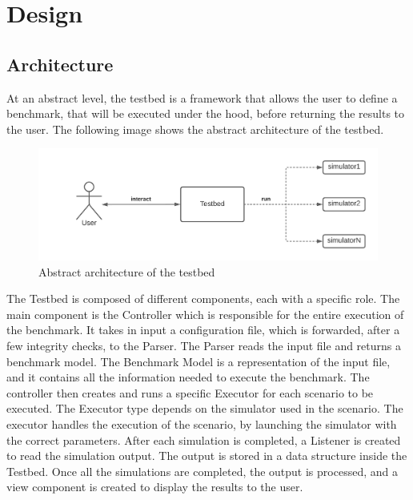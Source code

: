 \documentclass[12pt,a4paper,openright,twoside]{book}
\begin{document}
\chapter{Design}

\section{Architecture}

At an abstract level, the testbed is a framework that allows the user to define a benchmark, that will be executed under the hood, before returning the results to the user.
The following image shows the abstract architecture of the testbed.

\begin{figure}[H]
  \centering
  \includegraphics[width=\textwidth]{figures/architecture-high-level.png}
  \caption{Abstract architecture of the testbed}
\end{figure}

The Testbed is composed of different components, each with a specific role.
The main component is the Controller which is responsible for the entire execution of the benchmark. It takes in input a configuration file, which is forwarded, after a few integrity checks, to the Parser.
The Parser reads the input file and returns a benchmark model. The Benchmark Model is a representation of the input file, and it contains all the information needed to execute the benchmark.
The controller then creates and runs a specific Executor for each scenario to be executed. The Executor type depends on the simulator used in the scenario.
The executor handles the execution of the scenario, by launching the simulator with the correct parameters.
After each simulation is completed, a Listener is created to read the simulation output. The output is stored in a data structure inside the Testbed.
Once all the simulations are completed, the output is processed, and a view component is created to display the results to the user.
\end{document}
